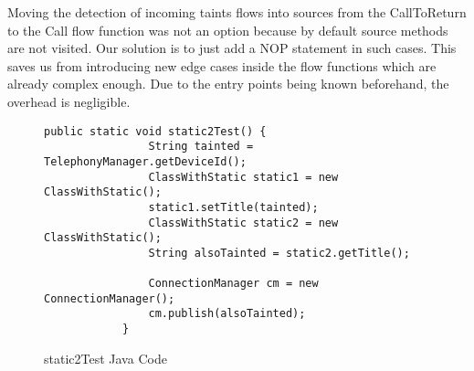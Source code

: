 \documentclass[../draft.tex]{subfiles}
\begin{document}
    Moving the detection of incoming taints flows into sources from the CallToReturn to the Call flow function was not an option because by default source methods are not visited. 
    Our solution is to just add a NOP statement in such cases. This saves us from introducing new edge cases inside the flow functions which are already complex enough. Due to the entry points being known beforehand, the overhead is negligible.

    \begin{figure}
        \centering
        \begin{lstlisting}[gobble=12]
            public static void static2Test() {
                String tainted = TelephonyManager.getDeviceId();
                ClassWithStatic static1 = new ClassWithStatic();
                static1.setTitle(tainted);
                ClassWithStatic static2 = new ClassWithStatic();
                String alsoTainted = static2.getTitle();
                
                ConnectionManager cm = new ConnectionManager();
                cm.publish(alsoTainted);
            }
        \end{lstlisting}
        \caption{static2Test Java Code}
        \label{lst:static2TestJava}
    \end{figure}
\end{document}
